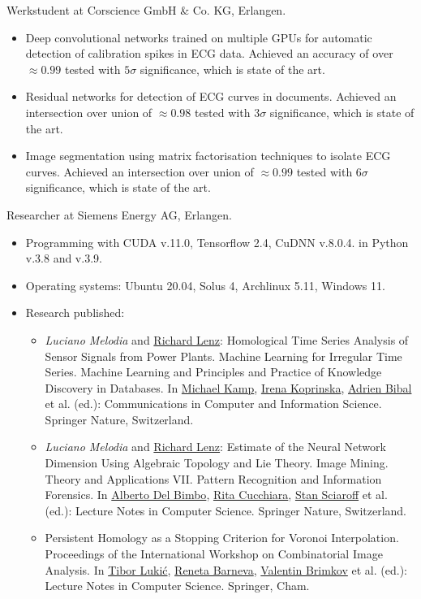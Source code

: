 \documentclass[a4paper, 11pt]{article}
\newcommand{\years}[1]{\marginnote{\scriptsize #1}}
\begin{document}
	\years{2021--22} Werkstudent at Corscience GmbH \& Co. KG, Erlangen.
	\begin{itemize}
		\item Deep convolutional networks trained on multiple GPUs for automatic detection of calibration spikes in ECG data. Achieved an accuracy of over $\approx 0.99$ tested with $5 \sigma$ significance, which is state of the art.

		\item Residual networks for detection of ECG curves in documents. Achieved an intersection over union of $\approx 0.98$ tested with $3\sigma$ significance, which is state of the art.

		\item Image segmentation using matrix factorisation techniques to isolate ECG curves. Achieved an intersection over union of $\approx 0.99$ tested with $6 \sigma$ significance, which is state of the art.
	\end{itemize}
	\years{2019--21} Researcher at Siemens Energy AG, Erlangen.
	\begin{itemize}
		\item Programming with CUDA v.11.0, Tensorflow 2.4, CuDNN v.8.0.4. in Python v.3.8 and v.3.9.

		\item Operating systems: Ubuntu 20.04, Solus 4, Archlinux 5.11, Windows 11. 

		\item Research published:
		\begin{itemize}
			\item \emph{Luciano Melodia} and \underline{Richard Lenz}: Homological Time Series Analysis of Sensor Signals from Power Plants. Machine Learning for Irregular Time Series. Machine Learning and Principles and Practice of Knowledge Discovery in Databases. In \underline{Michael Kamp}, \underline{Irena Koprinska}, \underline{Adrien Bibal} et al. (ed.): Communications in Computer and Information Science. Springer Nature, Switzerland.
			\item \emph{Luciano Melodia} and \underline{Richard Lenz}: Estimate of the Neural Network Dimension Using Algebraic Topology and Lie Theory. Image Mining. Theory and Applications VII. Pattern Recognition and Information Forensics. In \underline{Alberto Del Bimbo}, \underline{Rita Cucchiara}, \underline{Stan Sciaroff} et al. (ed.): Lecture Notes in Computer Science. Springer Nature, Switzerland.
			\item Persistent Homology as a Stopping Criterion for Voronoi Interpolation. Proceedings of the International Workshop on Combinatorial Image Analysis. In \underline{Tibor Lukić}, \underline{Reneta Barneva}, \underline{Valentin Brimkov} et al. (ed.): Lecture Notes in Computer Science. Springer, Cham.
		\end{itemize}
	\end{itemize}
\end{document}
